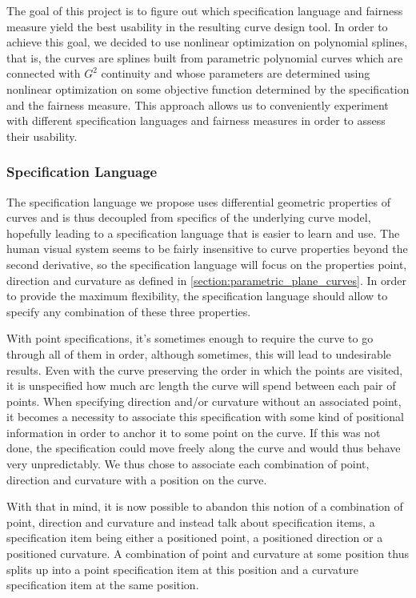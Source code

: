 \documentclass[a4paper]{article}
\begin{document}
			The goal of this project is to figure out which specification language and fairness measure yield the best usability in the resulting curve design tool. In order to achieve this goal, we decided to use nonlinear optimization on polynomial splines, that is, the curves are splines built from parametric polynomial curves which are connected with \(G^2\) continuity and whose parameters are determined using nonlinear optimization on some objective function determined by the specification and the fairness measure. This approach allows us to conveniently experiment with different specification languages and fairness measures in order to assess their usability.

			\subsubsection{Specification Language}
			\label{section:specification_language}

				The specification language we propose uses differential geometric properties of curves and is thus decoupled from specifics of the underlying curve model, hopefully leading to a specification language that is easier to learn and use. The human visual system seems to be fairly insensitive to curve properties beyond the second derivative, so the specification language will focus on the properties point, direction and curvature as defined in \ref{section:parametric_plane_curves}. In order to provide the maximum flexibility, the specification language should allow to specify any combination of these three properties.

				With point specifications, it's sometimes enough to require the curve to go through all of them in order, although sometimes, this will lead to undesirable results. Even with the curve preserving the order in which the points are visited, it is unspecified how much arc length the curve will spend between each pair of points. When specifying direction and/or curvature without an associated point, it becomes a necessity to associate this specification with some kind of positional information in order to anchor it to some point on the curve. If this was not done, the specification could move freely along the curve and would thus behave very unpredictably. We thus chose to associate each combination of point, direction and curvature with a position on the curve.

				With that in mind, it is now possible to abandon this notion of a combination of point, direction and curvature and instead talk about specification items, a specification item being either a positioned point, a positioned direction or a positioned curvature. A combination of point and curvature at some position thus splits up into a point specification item at this position and a curvature specification item at the same position.
\end{document}
